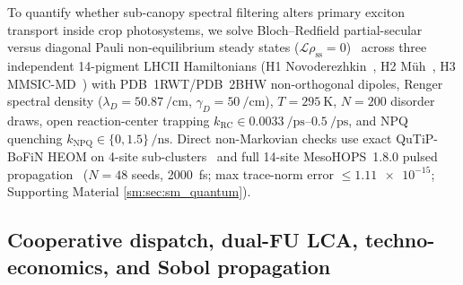 \documentclass[preprint,12pt,a4paper]{elsarticle}
\begin{document}
To quantify whether sub-canopy spectral filtering alters primary exciton transport inside crop photosystems, we solve Bloch--Redfield partial-secular versus diagonal Pauli non-equilibrium steady states ($\mathcal{L}\rho_{\mathrm{ss}}=0$)~\cite{Renger2003,Novoderezhkin2011,Muh2010,Kim2025SciAdv} across three independent 14-pigment LHCII Hamiltonians (H1 Novoderezhkin~\cite{Novoderezhkin2011}, H2 M\"uh~\cite{Muh2010}, H3 MMSIC-MD~\cite{Zhu2024JCTC}) with PDB~1RWT/\allowbreak PDB~2BHW non-orthogonal dipoles, Renger spectral density ($\lambda_D=\qty{50.87}{\per\centi\meter}$, $\gamma_D=\qty{50}{\per\centi\meter}$), $T=\qty{295}{\kelvin}$, $N=\num{200}$ disorder draws, open reaction-center trapping $k_{\mathrm{RC}}\in\qtyrange{0.0033}{0.5}{\per\pico\second}$, and NPQ quenching $k_{\mathrm{NPQ}}\in \{\num{0}, \num{1.5}\}\,\unit{\per\nano\second}$. Direct non-Markovian checks use exact QuTiP-BoFiN HEOM on 4-site sub-clusters~\cite{Tanimura1989,Lambert2023} and full 14-site MesoHOPS~1.8.0 pulsed propagation~\cite{Suess2015,Varvelo2021,Citty2024} ($N=\num{48}$ seeds, \qty{2000}{\femto\second}; max trace-norm error $\le \num{1.11e-15}$; Supporting Material \cref{sm:sec:sm_quantum}).

\subsection{Cooperative dispatch, dual-FU LCA, techno-economics, and Sobol propagation}
\label{sec:methods_tea}
\end{document}
